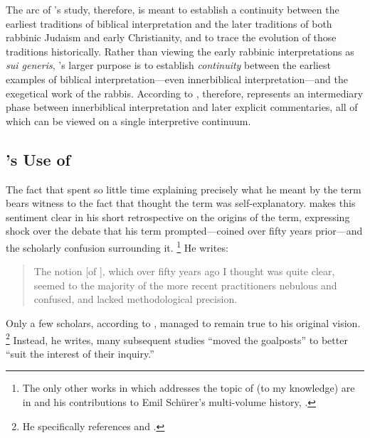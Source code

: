 The arc of \vermes's study, therefore, is meant to establish a continuity between the earliest traditions of biblical interpretation and the later traditions of both rabbinic Judaism and early Christianity, and to trace the evolution of those traditions historically. Rather than viewing the early rabbinic interpretations as \emph{sui generis}, \vermes's larger purpose is to establish \emph{continuity} between the earliest examples of biblical interpretation---even innerbiblical interpretation---and the exegetical work of the rabbis. According to \vermes, therefore, \rwb represents an intermediary phase between innerbiblical interpretation and later explicit commentaries, all of which can be viewed on a single interpretive continuum.

\subsection{\vermes's Use of \rwb} 

The fact that \vermes spent so little time explaining precisely what he meant by the term \rwb bears witness to the fact that \vermes thought the term was self-explanatory. \vermes makes this sentiment clear in his short retrospective on the origins of the term, expressing shock over the debate that his term prompted---coined over fifty years prior---and the scholarly confusion surrounding it.%
    \footnote{%
        The only other works in which \vermes addresses the topic of \rwb (to my knowledge) are in 
        \cite{vermes_eretz-israel1989} and his contributions to Emil Schürer's multi-volume history, 
        \cite{schurer1986}.}
He writes: 
\begin{quote}
    The notion [of \rwb], which over fifty years ago I thought was quite clear, seemed to the majority of the more recent practitioners nebulous and confused, and lacked methodological precision.%
    \autocite[3]{vermes_zsengeller2014}
\end{quote} 
\noindent
%
Only a few scholars, according to \vermes, managed to remain true to his original vision.%
    \footnote{%
        He specifically references
        \cite{alexander_carson-williamson1988} and 
        \cite{bernstein_textus2005}.}
%
Instead, he writes, many subsequent studies ``moved the goalposts'' to better ``suit the interest of their inquiry.''%
    \autocite[4]{vermes_zsengeller2014}

